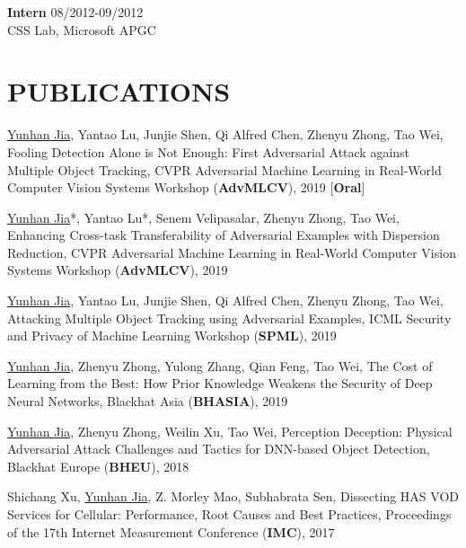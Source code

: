 \documentclass[margin]{res}
\begin{document}
\begin{resume}
\textbf{Intern} \hfill 08/2012-09/2012 \\
CSS Lab, Microsoft APGC


\section{PUBLICATIONS}
\underline{Yunhan Jia}, Yantao Lu, Junjie Shen, Qi Alfred Chen, Zhenyu Zhong, Tao Wei,
Fooling Detection Alone is Not Enough: First Adversarial Attack against Multiple Object Tracking, CVPR Adversarial Machine Learning in Real-World Computer Vision Systems Workshop (\textbf{AdvMLCV}), 2019 [\textbf{Oral}] \href{https://arxiv.org/pdf/1905.11026.pdf}{\color{blue}{[PDF]}}

\underline{Yunhan Jia}*, Yantao Lu*, Senem Velipasalar, Zhenyu Zhong, Tao Wei, Enhancing Cross-task Transferability of Adversarial Examples with Dispersion Reduction, CVPR Adversarial Machine Learning in Real-World Computer Vision Systems Workshop (\textbf{AdvMLCV}), 2019 \href{https://arxiv.org/pdf/1905.03333.pdf}{\color{blue}{[PDF]}}


\underline{Yunhan Jia}, Yantao Lu, Junjie Shen, Qi Alfred Chen, Zhenyu Zhong, Tao Wei,
Attacking Multiple Object Tracking using Adversarial Examples, ICML Security and Privacy of Machine Learning Workshop (\textbf{SPML}), 2019 \href{https://github.com/jiayunhan/jiayunhan.github.io/blob/master/material/fooling_spml19.pdf}{\color{blue}{[Poster]}}

\underline{Yunhan Jia}, Zhenyu Zhong, Yulong Zhang, Qian Feng, Tao Wei,
The Cost of Learning from the Best: How Prior Knowledge Weakens the Security of Deep Neural Networks, Blackhat Asia (\textbf{BHASIA}), 2019 \href{http://i.blackhat.com/asia-19/Thu-March-28/bh-asia-Jia-the-Cost-of-Learning-From-the-Best-How-Prior-Knowledge-Weakens-the-Security-of-Deep-Neural-Networks.pdf}{\color{blue}{[Slides]}}

\underline{Yunhan Jia}, Zhenyu Zhong, Weilin Xu, Tao Wei,
Perception Deception: Physical Adversarial Attack Challenges and Tactics for DNN-based Object Detection, Blackhat Europe (\textbf{BHEU}), 2018 \href{http://i.blackhat.com/eu-18/Thu-Dec-6/eu-18-Zhong-Perception-Deception-Physical-Adversarial-Attack-Challenges-and-Tactics-for-DNN-Based-Object-Detection.pdf}{\color{blue}{[Slides]}}

Shichang Xu, \underline{Yunhan Jia}, Z. Morley Mao, Subhabrata Sen,
Dissecting HAS VOD Services for Cellular: Performance, Root Causes and Best Practices, Proceedings of the 17th Internet Measurement Conference (\textbf{IMC}), 2017 \href{https://conferences.sigcomm.org/imc/2017/papers/imc17-final111.pdf}{\color{blue}{[PDF]}}


\end{resume}
\end{document}
